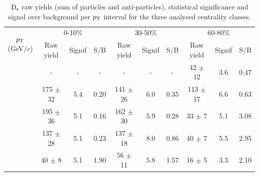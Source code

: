  \begin{table}[!h]
 \begin{center}
  \begin{tabular}{|c|c|c|c|c|c|c|c|c|c|}
\hline
\multirow{2}{*}{$p_{\rm T}$ (GeV$/c$)}& \multicolumn{3}{c|}{0-10$\%$} & \multicolumn{3}{c|}{30-50$\%$} & \multicolumn{3}{c|}{60-80$\%$} \\
\cline{2-10}
& Raw yield & Signif & S/B & Raw yield  & Signif & S/B & Raw yield  & Signif & S/B \\
\hline
\hline
[2,4] & -  & -& -& - & -  & - & 42 $\pm$ 12 & 3.6 & 0.47 \\
\hline
[4,6] &  175 $\pm$ 32 & 5.4  & 0.20 & 141 $\pm$ 26  & 6.0 & 0.35 & 113 $\pm$ 17 & 6.6 & 0.63\\
\hline
[6,8] &  195 $\pm$ 36  & 5.1 & 0.16 & 162 $\pm$ 30 & 5.9 & 0.28 & 33 $\pm$ 7 & 5.1 & 3.08 \\
\hline
[8,12] & 137 $\pm$ 28 & 5.1 & 0.23 & 137 $\pm$ 18 & 8.0 & 0.86 & 40 $\pm$ 7 & 5.5 & 2.95 \\
\hline
[12,16] & 40 $\pm$ 8  & 5.1 & 1.90 & 56 $\pm$ 11 & 5.8 & 1.57 & 16 $\pm$ 5 & 3.3 & 2.10 \\
\hline
  \end{tabular}
 \caption{${\rm D_s}$ raw yields (sum of particles and anti-particles), statistical significance and signal over background per $p_{\rm T}$ interval for the three analysed centrality classes.}
  \label{tab:signalDs_010_3050_6080}
\end{center}
\end{table} 

